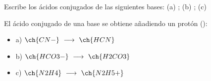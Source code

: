\begin{exerciseEVAU}
    Escribe los ácidos conjugados de las siguientes bases: (a)  ; (b) ; (c) 


%

    \begin{solu}
%

        El ácido conjugado de una base se obtiene añadiendo un protón ():

        \begin{itemize}
            \item a) \(\ch{CN-} \ \longrightarrow \ \ch{HCN}\)
            \item b) \(\ch{HCO3-} \ \longrightarrow \ \ch{H2CO3}\)
            \item c) \(\ch{N2H4} \ \longrightarrow \ \ch{N2H5+}\)
        \end{itemize}

    \end{solu}
\end{exerciseEVAU}

